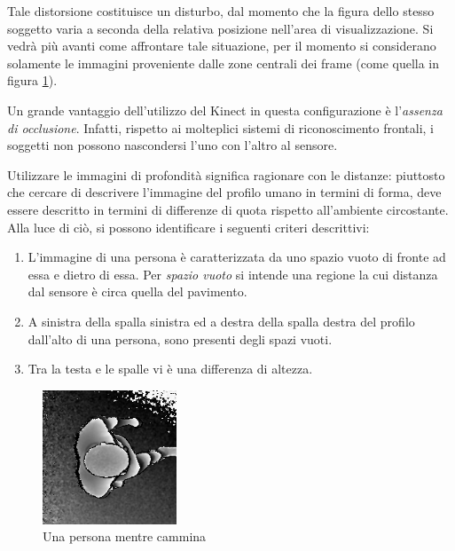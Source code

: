 Tale distorsione costituisce un disturbo, dal momento che la figura dello stesso soggetto varia a seconda della relativa posizione nell'area di visualizzazione.
Si vedrà più avanti come affrontare tale situazione, per il momento si considerano solamente le immagini proveniente dalle zone centrali dei frame (come quella in figura \ref{fig:spatial_feature}).

Un grande vantaggio dell'utilizzo del Kinect in questa configurazione è l'\emph{assenza di occlusione}.
Infatti, rispetto ai molteplici sistemi di riconoscimento frontali, i soggetti non possono nascondersi l'uno con l'altro al sensore.

Utilizzare le immagini di profondità significa ragionare con le distanze: piuttosto che cercare di descrivere l'immagine del profilo umano in termini di forma, deve essere descritto in termini di differenze di quota rispetto all'ambiente circostante.
Alla luce di ciò, si possono identificare i seguenti criteri descrittivi:

\begin{enumerate}
    \item L'immagine di una persona è caratterizzata da uno spazio vuoto di fronte ad essa e dietro di essa. Per \emph{spazio vuoto} si intende una regione la cui distanza dal sensore è circa quella del pavimento.
    \item A sinistra della spalla sinistra ed a destra della spalla destra del profilo dall'alto di una persona, sono presenti degli spazi vuoti.
    \item Tra la testa e le spalle vi è una differenza di altezza.

\end{enumerate}

\begin{figure}
    \begin{center}
        \includegraphics[width=4cm]{img/spatial_features.png}
    \end{center}
    \caption{Una persona mentre cammina}
    \label{fig:spatial_feature}
\end{figure}

